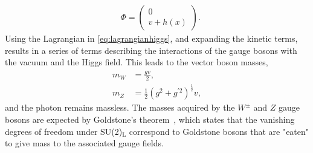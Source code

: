 \begin{equation}\renewcommand*{\arraystretch}{\newarraystrech}
    \label{eq:higgsfield}
    \begin{aligned}
        & \Phi = 
        \begin{pmatrix}
            0\\
            v + h(x)
        \end{pmatrix}.
     \end{aligned}
\end{equation}
Using the Lagrangian in \cref{eq:lagrangianhiggs}, and expanding the kinetic terms, results in a series of terms describing the interactions of the gauge bosons with the vacuum and the Higgs field. This leads to the vector boson masses, 
\begin{equation}
    \label{eq:bosonmasses}
    \begin{aligned}
        m_W &= \frac{gv}{2},\\
        m_Z &= \frac{1}{2}(g^2 + g^{\prime 2})^{\frac{1}{2}}v,
     \end{aligned}
\end{equation}
and the photon remains massless. The masses acquired by the $W^\pm$ and $Z$ gauge bosons are expected by Goldstone's theorem~\cite{PhysRev.127.965}, which states that the vanishing degrees of freedom under SU(2)$_\mathrm{L}$ correspond to Goldstone bosons that are "eaten" to give mass to the associated gauge fields. 

